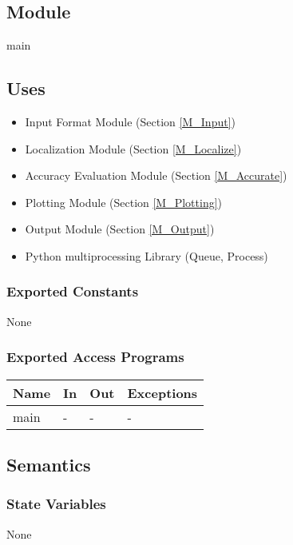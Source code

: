 \documentclass[12pt, titlepage]{article}
\begin{document}


\subsection{Module}

main

\subsection{Uses}
\begin{itemize}
  \item Input Format Module (Section \ref{M_Input})
  \item Localization Module (Section \ref{M_Localize})
  \item Accuracy Evaluation Module (Section \ref{M_Accurate})
  \item Plotting Module (Section \ref{M_Plotting})
  \item Output Module (Section \ref{M_Output})
  \item Python multiprocessing Library (Queue, Process)
\end{itemize}


\subsubsection{Exported Constants}
None

\subsubsection{Exported Access Programs}

\begin{center}
\begin{tabular}{p{2cm} p{4cm} p{4cm} p{2cm}}
\hline
\textbf{Name} & \textbf{In} & \textbf{Out} & \textbf{Exceptions} \\
\hline
main& - & - & - \\
\hline
\end{tabular}
\end{center}

\subsection{Semantics}

\subsubsection{State Variables}
None
\end{document}
